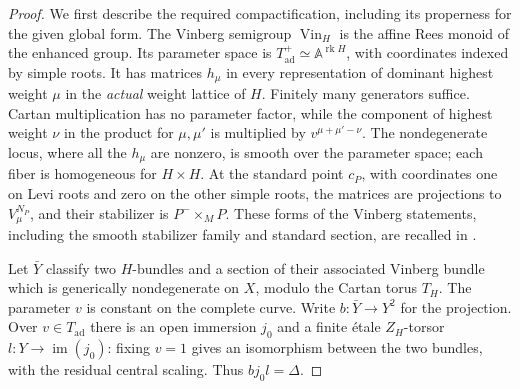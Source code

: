 \documentclass[11pt]{article}
\numberwithin{equation}{section}
\theoremstyle{definition}
\theoremstyle{remark}
\begin{document}
\begin{proof}
We first describe the required compactification, including its properness
for the given global form.  The Vinberg semigroup $\operatorname{Vin}_H$
is the affine Rees monoid of the enhanced group.  Its parameter space is
$T_{\mathrm{ad}}^+\simeq\mathbb A^{\operatorname{rk}H}$, with coordinates
indexed by simple roots.  It has matrices $h_\mu$ in every representation
of dominant highest weight $\mu$ in the \emph{actual} weight lattice of
$H$.  Finitely many generators suffice.  Cartan multiplication has no
parameter factor, while the component of highest weight $\nu$ in the
product for $\mu,\mu'$ is multiplied by $v^{\mu+\mu'-\nu}$.
The nondegenerate locus, where all the $h_\mu$ are nonzero, is smooth over
the parameter space; each fiber is homogeneous for $H\times H$.
At the standard point $c_P$, with coordinates one on Levi roots and zero
on the other simple roots, the matrices are projections to
$V_\mu^{N_P}$, and their stabilizer is $P^-\times_M P$.
These forms of the Vinberg statements, including the smooth stabilizer
family and standard section, are recalled in
\cite[Appendices~C--D]{DrinfeldGaitsgoryCT}.

Let $\bar Y$ classify two $H$-bundles and a section of their associated
Vinberg bundle which is generically nondegenerate on $X$, modulo the
Cartan torus $T_H$.  The parameter $v$ is constant on the complete curve.
Write $b:\bar Y\to Y^2$ for the projection.  Over $v\in T_{\mathrm{ad}}$
there is an open immersion $j_0$ and a finite \'{e}tale $Z_H$-torsor
$l:Y\to\operatorname{im}(j_0)$: fixing $v=1$ gives an isomorphism between
the two bundles, with the residual central scaling.  Thus $bj_0l=\Delta$.


\end{proof}
\end{document}

